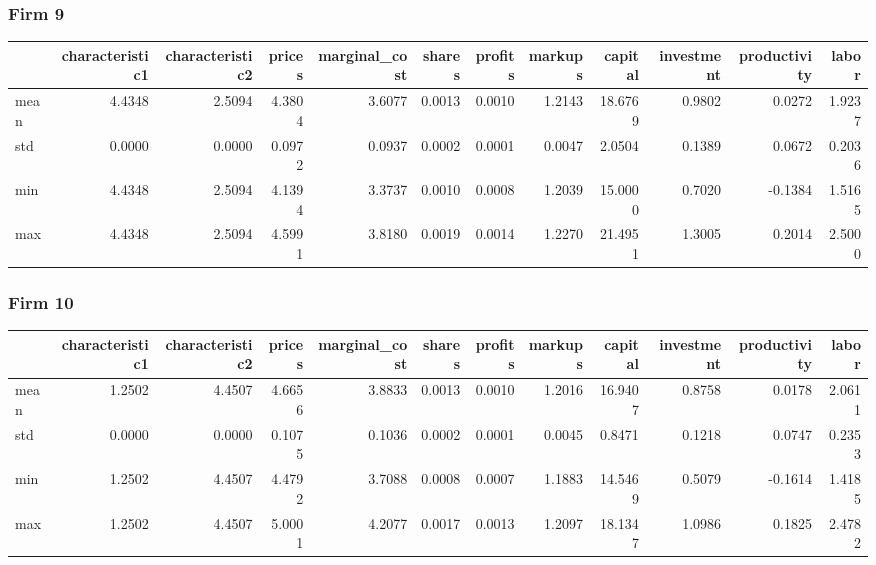  \subsubsection*{Firm 9}
\begin{tabular}{lrrrrrrrrrrr}
\toprule
{} &  characteristic1 &  characteristic2 &  prices &  marginal\_cost &  shares &  profits &  markups &  capital &  investment &  productivity &  labor \\
\midrule
mean &           4.4348 &           2.5094 &  4.3804 &         3.6077 &  0.0013 &   0.0010 &   1.2143 &  18.6769 &      0.9802 &        0.0272 & 1.9237 \\
std  &           0.0000 &           0.0000 &  0.0972 &         0.0937 &  0.0002 &   0.0001 &   0.0047 &   2.0504 &      0.1389 &        0.0672 & 0.2036 \\
min  &           4.4348 &           2.5094 &  4.1394 &         3.3737 &  0.0010 &   0.0008 &   1.2039 &  15.0000 &      0.7020 &       -0.1384 & 1.5165 \\
max  &           4.4348 &           2.5094 &  4.5991 &         3.8180 &  0.0019 &   0.0014 &   1.2270 &  21.4951 &      1.3005 &        0.2014 & 2.5000 \\
\bottomrule
\end{tabular}


 \subsubsection*{Firm 10}
\begin{tabular}{lrrrrrrrrrrr}
\toprule
{} &  characteristic1 &  characteristic2 &  prices &  marginal\_cost &  shares &  profits &  markups &  capital &  investment &  productivity &  labor \\
\midrule
mean &           1.2502 &           4.4507 &  4.6656 &         3.8833 &  0.0013 &   0.0010 &   1.2016 &  16.9407 &      0.8758 &        0.0178 & 2.0611 \\
std  &           0.0000 &           0.0000 &  0.1075 &         0.1036 &  0.0002 &   0.0001 &   0.0045 &   0.8471 &      0.1218 &        0.0747 & 0.2353 \\
min  &           1.2502 &           4.4507 &  4.4792 &         3.7088 &  0.0008 &   0.0007 &   1.1883 &  14.5469 &      0.5079 &       -0.1614 & 1.4185 \\
max  &           1.2502 &           4.4507 &  5.0001 &         4.2077 &  0.0017 &   0.0013 &   1.2097 &  18.1347 &      1.0986 &        0.1825 & 2.4782 \\
\bottomrule
\end{tabular}


